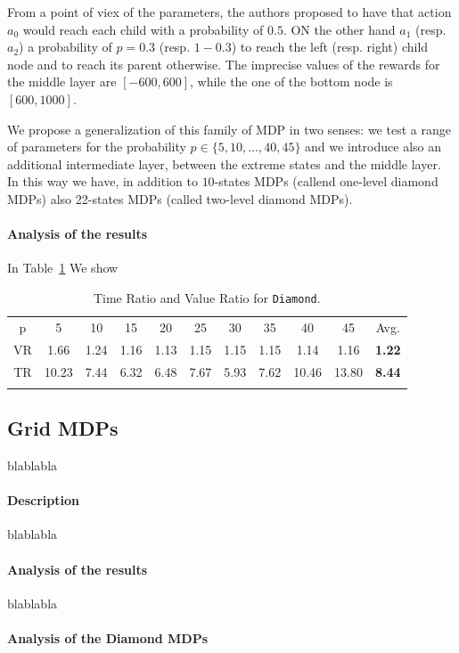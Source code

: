 From a point of viex of the parameters, the authors proposed to have that action $a_0$ would reach each child with a probability of $0.5$. ON the other hand $a_1$ (resp. $a_2$) a probability of $p= 0.3$ (resp. $1-0.3$) to reach the left (resp. right) child node and to reach its parent otherwise.
The imprecise values of the rewards for the middle layer are $[-600,600]$, while the one of the bottom node is $[600,1000]$.

We propose a generalization of this family of MDP in two senses: we test a range of parameters for the probability $p \in \{5,10,\dots,40,45\}$ and we introduce also an additional intermediate layer, between the extreme states and the middle layer. In this way we have, in addition to $10$-states MDPs (callend one-level diamond MDPs) also  22-states MDPs (called two-level diamond MDPs). 

\paragraph{Analysis of the results}
In Table~\ref{tab:diamond} We show


\begin{table}[h]																	
 \centering
 \small
 \setlength{\tabcolsep}{4.0pt}
 \renewcommand \arraystretch{1.8}
\begin{tabular}{ccccccccccc}																						
p	&	5	&	10	&	15	&	20	&	25	&	30	&	35	&	40	&	45	&	Avg.	\\	
\cmidrule(lr){1-1} \cmidrule(lr){2-10} \cmidrule(lr){11-11}
VR &	1.66	&	1.24	&	1.16	&	1.13	&	1.15	&	1.15	&	1.15	&	1.14	&	1.16	&	\textbf{1.22}	\\	
TR &	10.23	&	7.44	&	6.32	&	6.48	&	7.67	&	5.93	&	7.62	&	10.46	&	13.80	&	\textbf{8.44}	\\	\\
\end{tabular}
\caption{Time Ratio and Value Ratio for \texttt{Diamond}.}														\label{tab:diamond}								
\end{table}																						



\subsection{Grid MDPs}
blablabla
\paragraph{Description}
blablabla
\paragraph{Analysis of the results}
blablabla



\paragraph{Analysis of the Diamond MDPs}

